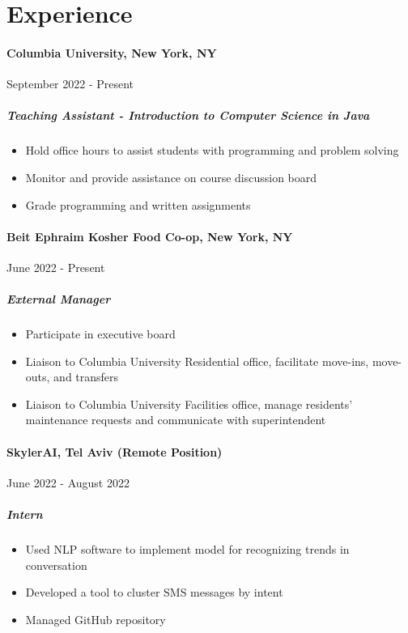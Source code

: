 \documentclass[12pt]{article}
\begin{document}
\vfill
\section*{Experience}

\paragraph*{Columbia University, New York, NY} \hfill September 2022 - Present
\subparagraph*{Teaching Assistant - Introduction to Computer Science in Java}
\begin{itemize}
    \item Hold office hours to assist students with programming and problem
    solving
    \item Monitor and provide assistance on course discussion board
    \item Grade programming and written assignments
\end{itemize}

\paragraph*{Beit Ephraim Kosher Food Co-op, New York, NY} \hfill June 2022 - Present
\subparagraph*{External Manager}
\begin{itemize}
    \item Participate in executive board
    \item Liaison to Columbia University Residential office, facilitate
    move-ins, move-outs, and transfers
    \item Liaison to Columbia University Facilities office, manage residents'
    maintenance requests and communicate with superintendent
\end{itemize}

\paragraph*{SkylerAI, Tel Aviv (Remote Position)} \hfill June 2022 - August 2022
\subparagraph*{Intern}
\begin{itemize}
    \item Used NLP software to implement model for recognizing trends in
    conversation
    \item Developed a tool to cluster SMS messages by intent
    \item Managed GitHub repository
\end{itemize}
\end{document}
